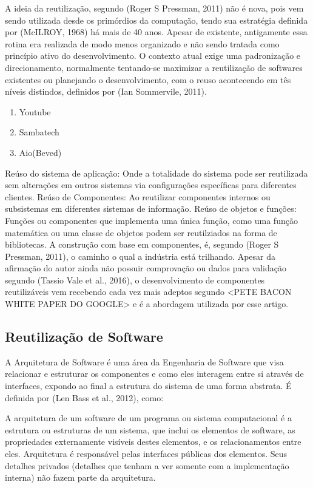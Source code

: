A ideia da reutilização, segundo (Roger S Pressman, 2011) não é nova, pois vem sendo utilizada desde os primórdios da computação, tendo sua estratégia definida por (McILROY, 1968) há mais de 40 anos. Apesar de existente, antigamente essa rotina era realizada de modo menos organizado e não sendo tratada como princípio ativo do desenvolvimento. O contexto atual exige uma padronização e direcionamento, normalmente tentando-se maximizar a reutilização de softwares existentes ou planejando o desenvolvimento, com o reuso acontecendo em tês níveis distindos, definidos por (Ian Sommervile, 2011).

\begin{enumerate}
	\item Youtube
	\item Sambatech
	\item Aio(Beved)
\end{enumerate}

Reúso do sistema de aplicação: Onde a totalidade do sistema pode ser reutilizada sem alterações em outros sistemas via configurações específicas para diferentes clientes.
Reúso de Componentes: Ao reutilizar componentes internos ou subsistemas em diferentes sistemas de informação.
Reúso de objetos e funções: Funções ou componentes que implementa uma única função, como uma função matemática ou uma classe de objetos  podem ser reutilziados na forma de bibliotecas. 
A construção com base em componentes, é, segundo (Roger S Pressman, 2011), o caminho o qual a indústria está trilhando. Apesar da afirmação do autor ainda não possuir comprovação ou dados para validação segundo (Tassio Vale et al., 2016), o desenvolvimento de componentes reutilizáveis vem recebendo cada vez mais adeptos segundo <PETE BACON WHITE PAPER DO GOOGLE>  e é a abordagem utilizada por esse artigo.

\subsection{\esp Reutilização de Software}

A Arquitetura de Software é uma área da Engenharia de Software que visa relacionar e estruturar os componentes e como eles interagem entre si através de interfaces, expondo ao final a estrutura do sistema de uma forma abstrata. É definida por (Len Bass et al., 2012), como:

A arquitetura de um software de um programa ou sistema computacional é a estrutura ou estruturas de um sistema, que inclui os elementos de software, as propriedades externamente visíveis destes elementos, e os relacionamentos entre eles. Arquitetura é responsável pelas interfaces públicas dos elementos. Seus detalhes privados (detalhes que tenham a ver somente com a implementação interna) não fazem parte da arquitetura.

